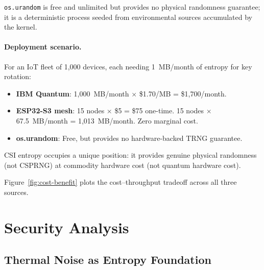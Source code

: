 \texttt{os.urandom} is free and unlimited but provides no physical randomness guarantee; it is a deterministic process seeded from environmental sources accumulated by the kernel.

\paragraph{Deployment scenario.}
For an IoT fleet of 1{,}000 devices, each needing 1~MB/month of entropy for key rotation:
\begin{itemize}
\item \textbf{IBM Quantum}: 1{,}000~MB/month $\times$ \$1.70/MB = \$1{,}700/month.
\item \textbf{ESP32-S3 mesh}: 15 nodes $\times$ \$5 = \$75 one-time. 15 nodes $\times$ 67.5~MB/month = 1{,}013~MB/month. Zero marginal cost.
\item \textbf{os.urandom}: Free, but provides no hardware-backed TRNG guarantee.
\end{itemize}

CSI entropy occupies a unique position: it provides genuine physical randomness (not CSPRNG) at commodity hardware cost (not quantum hardware cost).


Figure~\ref{fig:cost-benefit} plots the cost--throughput tradeoff across all three sources.




\section{Security Analysis}
\label{sec:security}

\subsection{Thermal Noise as Entropy Foundation}
\label{subsec:thermal}

